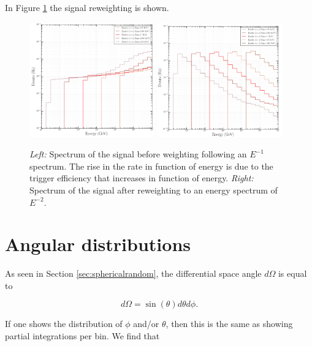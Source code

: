 \begin{appendices}
In Figure \ref{fig:signalweighting} the signal reweighting is shown.

\begin{figure}
\centering
\includegraphics[width=0.48\textwidth]{appendix/img/SpectrumBeforeWeighting.png}
\includegraphics[width=0.48\textwidth]{appendix/img/SpectrumAfterWeighting.png}
\caption{\textit{Left: }Spectrum of the signal before weighting following an $E^{-1}$ spectrum. The rise in the rate in function of energy is due to the trigger efficiency that increases in function of energy. \textit{Right: }Spectrum of the signal after reweighting to an energy spectrum of $E^{-2}$.}
\label{fig:signalweighting}
\end{figure}

\section{Angular distributions}
\label{sec:angularappendix}
As seen in Section \ref{sec:sphericalrandom}, the differential space angle $d\Omega$ is equal to

\begin{equation}
d\Omega = \sin(\theta) d\theta d\phi.
\end{equation} 

\noindent If one shows the distribution of $\phi$ and/or $\theta$, then this is the same as showing partial integrations per bin. We find that


\end{appendices}
